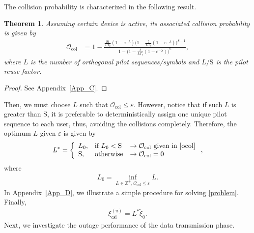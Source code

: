 \documentclass[10pt,journal,a4paper]{IEEEtran}
\newtheorem{theorem}{Theorem}
\begin{document}
    The collision probability is characterized in the following result.
	\begin{theorem}\label{the4}
		Assuming certain device is active, its associated collision probability is given by
		\begin{align}
		\mathcal{O}_\mathrm{col}&=1-\frac{\frac{\mathrm{S}t}{LT_c}(1-e^{-\lambda})\Big(1-\frac{t}{LT_c}(1-e^{-\lambda})\Big)^{\mathrm{S}-1}}{1-\Big(1-\frac{t}{LT_c}(1-e^{-\lambda})\Big)^{\mathrm{S}}},\label{ocol}
		\end{align}
		where $L$ is the number of orthogonal pilot sequences/symbols and $L/\mathrm{S}$ is the pilot reuse factor.
	\end{theorem}
\begin{proof}
	See Appendix~\ref{App_C}. \phantom\qedhere
\end{proof}
	Then, we must choose $L$ such that $\mathcal{O}_\mathrm{col}\le\varepsilon$. However, notice that if such $L$ is greater than $\mathrm{S}$, it is preferable to deterministically assign  one unique pilot sequence to each user, thus,  avoiding  the collisions completely. Therefore, the optimum $L$ given $\varepsilon$ is given by
	\begin{align}
	L^*=\left\{\begin{array}{lll}
	L_0, &\text{if}\ L_0<\mathrm{S}&\rightarrow \mathcal{O}_\mathrm{col}\ \text{given in \eqref{ocol}} \\
	\mathrm{S}, &\text{otherwise}&\rightarrow \mathcal{O}_\mathrm{col}=0
	\end{array}\right.,\label{Leq}
	\end{align}
	where 
	\begin{align}
	L_0 = \inf_{L\in\mathbb{Z}^+,\mathcal{O}_\mathrm{col}\le \varepsilon} L.\label{problem}
	\end{align}
	In Appendix~\ref{App_D}, we illustrate a simple procedure for solving \eqref{problem}. Finally,
	\begin{align}
	\xi_\mathrm{csi}^{(u)}=L^*\tilde{\xi}_0.
	\end{align}
	Next, we investigate the outage performance of the data transmission phase.
\end{document}
